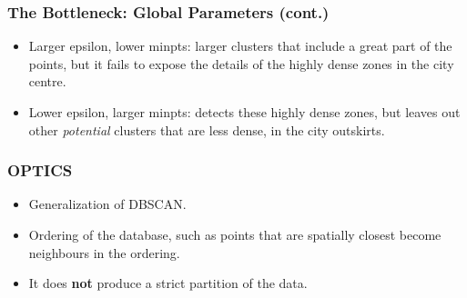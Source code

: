 \documentclass[hyperref={pdfpagelabels=true}]{beamer}
\begin{document}

\begin{frame}
\frametitle{The Bottleneck: Global Parameters (cont.)}
\begin{itemize}
      \item<2->Larger epsilon, lower minpts: larger clusters that include a great part of the points, but it fails to expose the details of the highly dense zones in the city centre.
      \item<3->Lower epsilon, larger minpts: detects these highly dense zones, but leaves out other \textit{potential} clusters that are less dense, in the city outskirts.
\end{itemize}                
\end{frame}


\begin{frame}
\frametitle{OPTICS}
\begin{itemize}%
      \item<2->Generalization of DBSCAN.%
      \item<3->Ordering of the database, such as points that are spatially closest become neighbours in the ordering.
      \item<4->It does \textbf{not} produce a strict partition of the data.%
\end{itemize}                
\end{frame}
\end{document}
